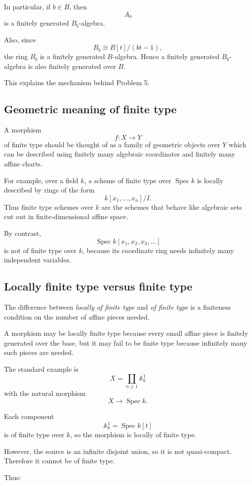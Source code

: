 \documentclass[12pt,a4paper]{article}
\DeclareMathOperator{\Spec}{Spec}
\providecommand{\Spec}{\operatorname{Spec}}
\theoremstyle{notespace}
\begin{document}
In particular, if \(b\in B\), then
\[
A_b
\]
is a finitely generated \(B_b\)-algebra.

Also, since
\[
B_b\cong B[t]/(bt-1),
\]
the ring \(B_b\) is a finitely generated \(B\)-algebra. Hence a finitely generated \(B_b\)-algebra is also finitely generated over \(B\).

This explains the mechanism behind Problem 5.

\subsection{Geometric meaning of finite type}

A morphism
\[
f:X\to Y
\]
of finite type should be thought of as a family of geometric objects over \(Y\) which can be described using finitely many algebraic coordinates and finitely many affine charts.

For example, over a field \(k\), a scheme of finite type over \(\Spec k\) is locally described by rings of the form
\[
k[x_1,\dots,x_n]/I.
\]
Thus finite type schemes over \(k\) are the schemes that behave like algebraic sets cut out in finite-dimensional affine space.

By contrast,
\[
\Spec k[x_1,x_2,x_3,\dots]
\]
is not of finite type over \(k\), because its coordinate ring needs infinitely many independent variables.

\subsection{Locally finite type versus finite type}

The difference between \emph{locally of finite type} and \emph{of finite type} is a finiteness condition on the number of affine pieces needed.

A morphism may be locally finite type because every small affine piece is finitely generated over the base, but it may fail to be finite type because infinitely many such pieces are needed.

The standard example is
\[
X=\coprod_{n\geq 1}\mathbb A_k^1
\]
with the natural morphism
\[
X\to \Spec k.
\]

Each component
\[
\mathbb A_k^1=\Spec k[t]
\]
is of finite type over \(k\), so the morphism is locally of finite type.

However, the source is an infinite disjoint union, so it is not quasi-compact. Therefore it cannot be of finite type.

Thus:
\end{document}
